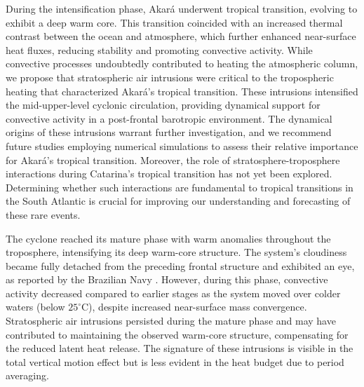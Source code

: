 \documentclass[pdflatex,sn-chicago]{sn-jnl}%
\theoremstyle{plain}
\theoremstyle{definition}
\theoremstyle{remark}
\theoremstyle{definition}
\begin{document}
During the intensification phase, Akará underwent tropical transition, evolving to exhibit a deep warm core. This transition coincided with an increased thermal contrast between the ocean and atmosphere, which further enhanced near-surface heat fluxes, reducing stability and promoting convective activity. While convective processes undoubtedly contributed to heating the atmospheric column, we propose that stratospheric air intrusions were critical to the tropospheric heating that characterized Akará's tropical transition. These intrusions intensified the mid-upper-level cyclonic circulation, providing dynamical support for convective activity in a post-frontal barotropic environment. The dynamical origins of these intrusions warrant further investigation, and we recommend future studies employing numerical simulations to assess their relative importance for Akará's tropical transition. Moreover, the role of stratosphere-troposphere interactions during Catarina's tropical transition has not yet been explored. Determining whether such interactions are fundamental to tropical transitions in the South Atlantic is crucial for improving our understanding and forecasting of these rare events.

The cyclone reached its mature phase with warm anomalies throughout the troposphere, intensifying its deep warm-core structure. The system's cloudiness became fully detached from the preceding frontal structure and exhibited an eye, as reported by the Brazilian Navy \citep{marinha2024}. However, during this phase, convective activity decreased compared to earlier stages as the system moved over colder waters (below $25^{\circ}\text{C}$), despite increased near-surface mass convergence. Stratospheric air intrusions persisted during the mature phase and may have contributed to maintaining the observed warm-core structure, compensating for the reduced latent heat release. The signature of these intrusions is visible in the total vertical motion effect but is less evident in the heat budget due to period averaging.
\end{document}
